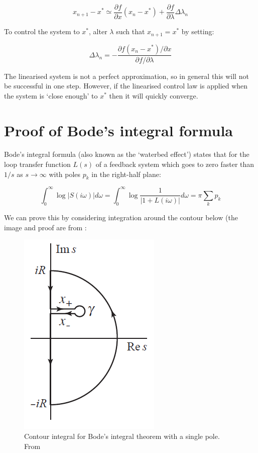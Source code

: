 \documentclass[11pt]{article} %
\begin{document}
\begin{equation}
x_{n+1} - x^{*} \simeq \frac{\partial f}{\partial x}(x_{n} - x^{*}) + \frac{\partial f}{\partial \lambda}\Delta \lambda_{n}
\end{equation}

To control the system to $x^{*}$, alter $\lambda$ such that $x_{n+1} = x^{*}$ by setting:

\begin{equation}
\Delta \lambda_{n} = - \frac{\partial f(x_{n} - x^{*})/\partial x}{\partial f / \partial \lambda}
\end{equation}

The linearised system is not a perfect approximation, so in general this will not be successful in one step. However, if the linearised control law is applied when the system is `close enough' to $x^{*}$ then it will quickly converge.

\section{Proof of Bode's integral formula}
Bode's integral formula (also known as the `waterbed effect') states that for the loop transfer function $L(s)$ of a feedback system which goes to zero faster than $1/s$ as $s \to \infty$ with poles $p_{k}$ in the right-half plane:

\begin{equation}
\int^{\infty}_{0}\log |S(i \omega)| d\omega = \int^{\infty}_{0}\log\frac{1}{|1 + L(i \omega)|}d\omega = \pi \sum_{k} p_{k}
\end{equation}

We can prove this by considering integration around the contour below (the image and proof are from \cite{astrom_feedback_2010}:

\begin{figure}[h!]
  \centering
    \includegraphics[scale = 0.5]{bodePlot}
  \caption{Contour integral for Bode's integral theorem with a single pole. From \cite{astrom_feedback_2010}}
\end{figure}
\end{document}
